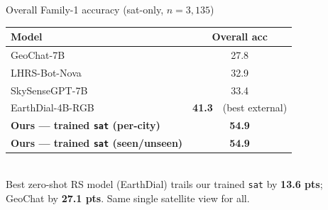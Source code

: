\documentclass[aspectratio=169]{beamer}
\newcommand{\best}[1]{\textbf{#1}}
\begin{document}
\begin{frame}{Overall Family-1 accuracy (sat-only, $n=3{,}135$)}
\centering\footnotesize
\begin{tabular}{lc}
\toprule
Model & Overall acc \\
\midrule
GeoChat-7B            & 27.8 \\
LHRS-Bot-Nova         & 32.9 \\
SkySenseGPT-7B        & 33.4 \\
EarthDial-4B-RGB      & \best{41.3}\ \ (best external) \\
\midrule
\textcolor{ours}{\textbf{Ours --- trained \texttt{sat} (per-city)}}   & \textcolor{ours}{\textbf{54.9}} \\
\textcolor{ours}{\textbf{Ours --- trained \texttt{sat} (seen/unseen)}} & \textcolor{ours}{\textbf{54.9}} \\
\bottomrule
\end{tabular}\\[8pt]
\small Best zero-shot RS model (EarthDial) trails our trained \texttt{sat} by
\textbf{\textcolor{good}{13.6 pts}}; GeoChat by \textbf{27.1 pts}. Same single satellite
view for all.
\end{frame}
\end{document}
